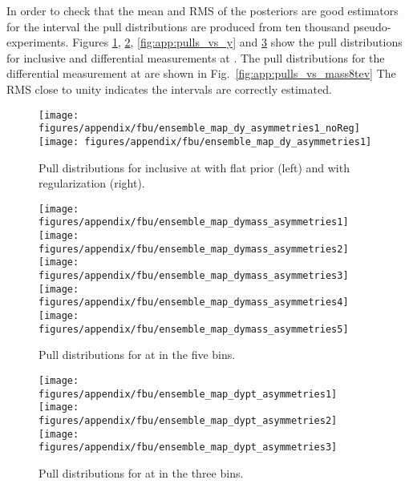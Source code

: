 In order to check that the mean and RMS of the \ac{} posteriors are
good estimators for the \ac{} interval the pull distributions are
produced from ten thousand pseudo-experiments.
Figures \ref{fig:app:pulls_inclu}, \ref{fig:app:pulls_vs_mass},
\ref{fig:app:pulls_vs_y} and \ref{fig:app:pulls_vs_pt} show the pull
distributions for inclusive and differential measurements at \seventev{}.
The pull distributions for the differential measurement at \eighttev{}
are shown in Fig.~\ref{fig:app:pulls_vs_mass8tev}
The RMS close to unity indicates the intervals are correctly estimated.

\begin{figure}
  \begin{center}
  \texttt{[image: figures/appendix/fbu/ensemble\_map\_dy\_asymmetries1\_noReg]}
  \texttt{[image: figures/appendix/fbu/ensemble\_map\_dy\_asymmetries1]}
  \caption{
    \label{fig:app:pulls_inclu}
    Pull distributions for inclusive \ac{} at \seventev{} with flat prior (left) and with regularization (right).
  }
  \end{center}
\end{figure}

\begin{figure}
  \begin{center}
  \texttt{[image: figures/appendix/fbu/ensemble\_map\_dymass\_asymmetries1]}
  \texttt{[image: figures/appendix/fbu/ensemble\_map\_dymass\_asymmetries2]}
  \texttt{[image: figures/appendix/fbu/ensemble\_map\_dymass\_asymmetries3]}
  \texttt{[image: figures/appendix/fbu/ensemble\_map\_dymass\_asymmetries4]}
  \texttt{[image: figures/appendix/fbu/ensemble\_map\_dymass\_asymmetries5]}
  \caption{
    \label{fig:app:pulls_vs_mass}
    Pull distributions for \ac{} at \seventev{} in the five \mtt{} bins.
  }
  \end{center}
\end{figure}

\begin{figure}
  \begin{center}
  \texttt{[image: figures/appendix/fbu/ensemble\_map\_dypt\_asymmetries1]}
  \texttt{[image: figures/appendix/fbu/ensemble\_map\_dypt\_asymmetries2]}
  \texttt{[image: figures/appendix/fbu/ensemble\_map\_dypt\_asymmetries3]}
  \caption{
    \label{fig:app:pulls_vs_pt}
    Pull distributions for \ac{} at \seventev{} in the three \pttt{} bins.
  }
  \end{center}
\end{figure}


